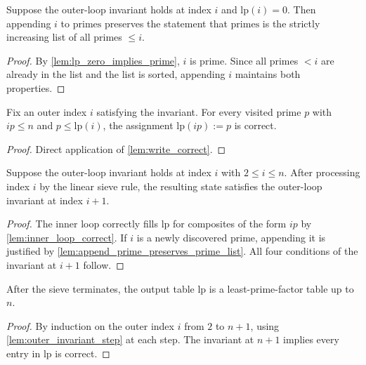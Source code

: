 \begin{lemma}
    \label{lem:append_prime_preserves_prime_list}
    Suppose the outer-loop invariant holds at index $i$ and $\mathrm{lp}(i)=0$.
    Then appending $i$ to $\mathrm{primes}$ preserves the statement that $\mathrm{primes}$ is the strictly increasing list of all primes $\le i$.
\end{lemma}
\begin{proof}
    By \ref{lem:lp_zero_implies_prime}, $i$ is prime. Since all primes $< i$ are already in the list and the list is sorted, appending $i$ maintains both properties.
\end{proof}

\begin{lemma}
    \label{lem:inner_loop_correct}
    Fix an outer index $i$ satisfying the invariant.
    For every visited prime $p$ with $ip\le n$ and $p\le \mathrm{lp}(i)$, the assignment $\mathrm{lp}(ip):=p$ is correct.
\end{lemma}
\begin{proof}
    Direct application of \ref{lem:write_correct}.
\end{proof}

\begin{lemma}
    \label{lem:outer_invariant_step}
    Suppose the outer-loop invariant holds at index $i$ with $2\le i\le n$.
    After processing index $i$ by the linear sieve rule, the resulting state satisfies the outer-loop invariant at index $i+1$.
\end{lemma}
\begin{proof}
    The inner loop correctly fills $\mathrm{lp}$ for composites of the form $ip$ by \ref{lem:inner_loop_correct}. If $i$ is a newly discovered prime, appending it is justified by \ref{lem:append_prime_preserves_prime_list}. All four conditions of the invariant at $i+1$ follow.
\end{proof}

\begin{theorem}
    \label{thm:lpf_correct}
    After the sieve terminates, the output table $\mathrm{lp}$ is a least-prime-factor table up to $n$.
\end{theorem}
\begin{proof}
    By induction on the outer index $i$ from $2$ to $n+1$, using \ref{lem:outer_invariant_step} at each step. The invariant at $n+1$ implies every entry in $\mathrm{lp}$ is correct.
\end{proof}

